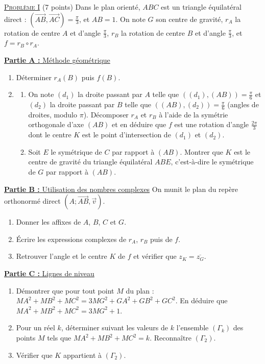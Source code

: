 \noindent \underline{\textsc{Probl\`eme I}} (7 points) \newline
Dans le plan orient\'e, $ABC$ est un triangle \'equilat\'eral direct : $(\overrightarrow{AB}, \overrightarrow{AC}) = \frac{\pi}{3}$, et $AB = 1$.
On note $G$ son centre de gravit\'e, $r_A$ la rotation de centre $A$ et d'angle $\frac{\pi}{3}$, $r_B$ la rotation de centre $B$ et
d'angle $\frac{\pi}{3}$, et $f = r_B \circ r_A$.

\underline{\textbf{Partie A :} M\'ethode g\'eom\'etrique}
\begin{enumerate}
      \item D\'eterminer $r_A(B)$ puis $f(B)$.
      \item \begin{enumerate}
            \item On note $(d_1)$ la droite passant par $A$ telle que $\left((d_1) , (AB)\right) = \frac{\pi}{6}$ et $(d_2)$ la droite
                  passant par $B$ telle que $\left((AB) , (d_2)\right) = \frac{\pi}{6}$ (angles de droites, modulo $\pi$).
                  D\'ecomposer $r_A$ et $r_B$ \`a l'aide de la sym\'etrie orthogonale d'axe $(AB)$ et en d\'eduire que $f$ est
                  une rotation d'angle $\frac{2\pi}{3}$ dont le centre $K$ est le point d'intersection de $(d_1)$ et $(d_2)$.
            \item Soit $E$ le sym\'etrique de $C$ par rapport \`a $(AB)$. Montrer que $K$ est le centre de gravit\'e du triangle
                  \'equilat\'eral $ABE$, c'est-\`a-dire le sym\'etrique de $G$ par rapport \`a $(AB)$.
            \end{enumerate}
\end{enumerate}
\underline{\textbf{Partie B :} Utilisation des nombres complexes} \newline
On munit le plan du rep\`ere orthonorm\'e direct $(A ; \overrightarrow{AB}, \vec{v})$.
\begin{enumerate}
      \item Donner les affixes de $A$, $B$, $C$ et $G$.
      \item \'Ecrire les expressions complexes de $r_A$, $r_B$ puis de $f$.
      \item Retrouver l'angle et le centre $K$ de $f$ et v\'erifier que $z_K = \overline{z_G}$.
\end{enumerate}
\underline{\textbf{Partie C :} Lignes de niveau}
\begin{enumerate}
      \item D\'emontrer que pour tout point $M$ du plan : $MA^2 + MB^2 + MC^2 = 3MG^2 + GA^2 + GB^2 + GC^2$.
            En d\'eduire que $MA^2 + MB^2 + MC^2 = 3MG^2 + 1$.
      \item Pour un r\'eel $k$, d\'eterminer suivant les valeurs de $k$ l'ensemble $(\Gamma_k)$ des points $M$ tels que
            $MA^2 + MB^2 + MC^2 = k$. Reconna\^itre $(\Gamma_2)$.
      \item V\'erifier que $K$ appartient \`a $(\Gamma_2)$.
\end{enumerate}

